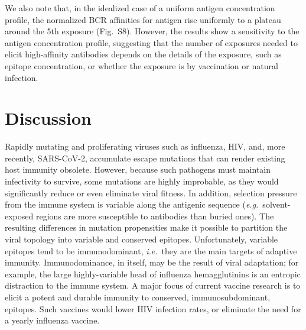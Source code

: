 \documentclass[utf8]{frontiersHLTH}%
\newcommand{\cred}[1]{\textsf{\color{red}#1}}
\def\ie {{\it i.e.}}
\def\eg {{\it e.g.}}
\begin{document}
\cred{We also note that, in the idealized case of a uniform antigen concentration
profile, the normalized BCR affinities for antigen rise uniformly to a
plateau around the 5th exposure (Fig.~S8). However, the results show a
sensitivity to the antigen concentration profile, suggesting that the
number of exposures needed to elicit high-affinity antibodies
depends on the details of the exposure, such as epitope concentration, or
whether the exposure is by vaccination or natural infection.}

\section{Discussion}
\label{sec:discussion}
Rapidly mutating and proliferating viruses such as influenza, HIV, and,
more recently, SARS-CoV-2, accumulate escape mutations that can
render existing host immunity obsolete. However, because such pathogens
must maintain infectivity to survive, some mutations are highly
improbable, as they would significantly reduce or even eliminate viral
fitness. In addition, selection pressure from the immune system is variable
along the antigenic sequence (\eg~solvent-exposed regions are more susceptible to antibodies than buried ones).
The resulting differences in mutation
propensities make it possible to partition the viral topology into variable and conserved epitopes.
Unfortunately, variable epitopes tend to be immunodominant, \ie~they are the main
targets of adaptive immunity. Immunodominance, in itself, may be the result of viral
adaptation; for example, the large highly-variable head of influenza hemagglutinins
is an entropic distraction to the immune system.
A major focus of current vaccine research is to elicit a potent and durable
immunity to conserved, immunosubdominant, epitopes.  Such vaccines
would
lower HIV infection rates, or eliminate the need for a yearly influenza
vaccine.
\end{document}
